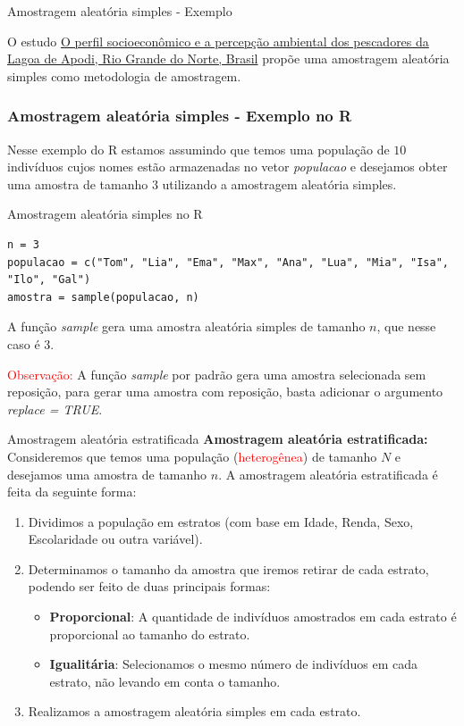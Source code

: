 \begin{frame}{Amostragem aleatória simples - Exemplo}
\begin{exemplo}
    O estudo \href{https://www.scielo.br/j/inter/a/FH3ZBH3kPbKxDKrjwBgFHQD/}{O perfil socioeconômico e a percepção ambiental dos pescadores da Lagoa de Apodi,
     Rio Grande do Norte, Brasil} propõe uma amostragem aleatória simples como metodologia de amostragem. 
\end{exemplo}

    
\end{frame}
\begin{frame}[fragile]
\frametitle{Amostragem aleatória simples - Exemplo no R}
Nesse exemplo do R estamos assumindo que temos uma população de $10$ indivíduos cujos nomes estão armazenadas no vetor \textit{populacao} e desejamos
obter uma amostra de tamanho $3$ utilizando a amostragem aleatória simples. 
\begin{block}{Amostragem aleatória simples no R}
\begin{verbatim}
n = 3
populacao = c("Tom", "Lia", "Ema", "Max", "Ana", "Lua", "Mia", "Isa", "Ilo", "Gal")
amostra = sample(populacao, n)
\end{verbatim}
\end{block}
\pause
A função \textit{sample} gera uma amostra aleatória simples de tamanho $n$, que nesse caso é $3$.
\pause

\textcolor{red}{Observação:} A função \textit{sample} por padrão gera uma amostra selecionada sem reposição, para gerar uma amostra com reposição, basta 
adicionar o argumento \textit{replace = TRUE}.
\end{frame}

\begin{frame}{Amostragem aleatória estratificada}
\textbf{Amostragem aleatória estratificada: }Consideremos que temos uma população (\textcolor{red}{heterogênea}) de tamanho $N$ e desejamos uma amostra de tamanho $n$.
A amostragem aleatória estratificada é feita da seguinte forma:
\begin{enumerate}
    \item Dividimos a população em estratos (com base em Idade, Renda, Sexo, Escolaridade ou outra variável).
    \pause
    \item Determinamos o tamanho da amostra que iremos retirar de cada estrato, podendo ser feito de duas principais formas:
    \pause
    \begin{itemize}
        \item \textbf{Proporcional}: A quantidade de indivíduos amostrados em cada estrato é proporcional ao tamanho do estrato. 
        \item \textbf{Igualitária}:  Selecionamos o mesmo número de indivíduos em cada estrato, não levando em conta o tamanho. 
    \end{itemize}
    \pause
    \item Realizamos a amostragem aleatória simples em cada estrato. 
\end{enumerate}
\end{frame}

